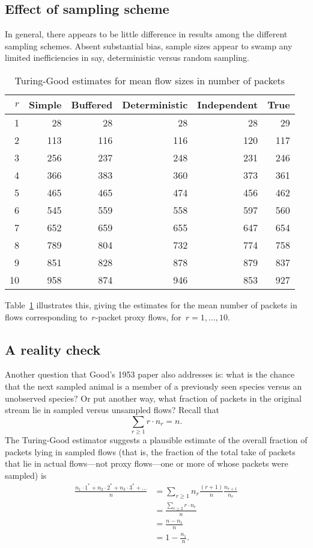 \documentclass{paper}
\begin{document}
\subsection{Effect of sampling scheme}

In general, there appears to be little difference in results among the different
sampling schemes. Absent substantial bias, sample sizes appear to swamp any
limited inefficiencies in say, deterministic versus random sampling.

\begin{table}
\begin{center}
\begin{tabular}{r r r r r r}
$r$ & Simple & Buffered & Deterministic & Independent & True \\
\midrule
 1 &  28 &  28 &  28 &  28 &  29 \\
 2 & 113 & 116 & 116 & 120 & 117 \\
 3 & 256 & 237 & 248 & 231 & 246 \\
 4 & 366 & 383 & 360 & 373 & 361 \\
 5 & 465 & 465 & 474 & 456 & 462 \\
 6 & 545 & 559 & 558 & 597 & 560 \\
 7 & 652 & 659 & 655 & 647 & 654 \\
 8 & 789 & 804 & 732 & 774 & 758 \\
 9 & 851 & 828 & 878 & 879 & 837 \\
10 & 958 & 874 & 946 & 853 & 927 \\
\end{tabular}
\caption{Turing-Good estimates for mean flow sizes in number of packets}
\label{tg_est}
\end{center}
\end{table}

Table~\ref{tg_est} illustrates this, giving the estimates for the mean number of
packets in flows corresponding to~$r$-packet proxy flows, for~$r = 1, \dots,
10$.

\subsection{A reality check}

Another question that Good's 1953 paper also addresses is: what is the chance
that the next sampled animal is a member of a previously seen species versus an
unobserved species? Or put another way, what fraction of packets in the original
stream lie in sampled versus unsampled flows? Recall that
$$ \sum_{r \geq 1} r \cdot n_r = n. $$
The Turing-Good estimator suggests a plausible estimate of the overall fraction
of packets lying in sampled flows (that is, the fraction of the total take of
packets that lie in actual flows---not proxy flows---one or more of whose
packets were sampled) is
\begin{align*}
  \frac{n_1 \cdot 1^* + n_2 \cdot 2^* + n_3 \cdot 3^* + \dots}{n}
  &= \sum_{r \geq 1} n_r \frac{(r + 1)}{n} \frac{n_{r+1}}{n_r} \\
  &= \frac{\sum_{r \geq 2} r \cdot n_r}{n} \\
  &= \frac{n - n_1}{n} \\
  &= 1 - \frac{n_1}{n}.
\end{align*}
\end{document}
